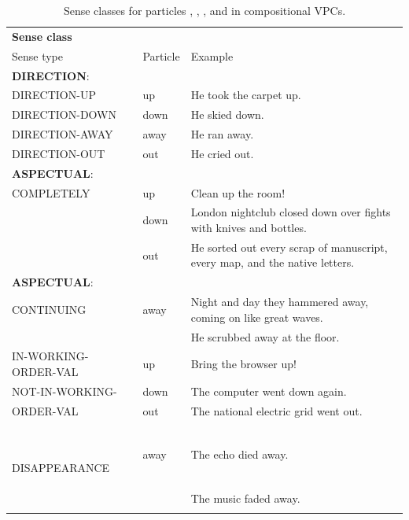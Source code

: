 \documentclass[output=paper,modfonts,nonflat]{langsci/langscibook}
\begin{document}
 
\begin{table}%
\caption{Sense classes for particles , , , and  in compositional VPCs.}
\label{tab:1:senseclasses-prtcls}
\footnotesize
\begin{tabularx}{\textwidth}{llQ}
  \lsptoprule
  \textbf{Sense class}\\
  Sense type & Particle & Example \\\midrule

    \textbf{DIRECTION}: & & \\
    \midrule
    DIRECTION-UP & up & He took the carpet up. \\
    DIRECTION-DOWN & down & He skied down. \\
    DIRECTION-AWAY & away & He ran away. \\
    DIRECTION-OUT & out & He cried out.\\

    \textbf{ASPECTUAL}: & & \\
    \midrule
    COMPLETELY & up & Clean up the room! \\
                        & down & London nightclub closed down over fights with knives and bottles. \\
                        & out & He sorted out every scrap of manuscript, every map, and the native letters.  \\
   
    \textbf{ASPECTUAL}: & & \\
    \midrule
    CONTINUING & away & Night and day they hammered away, coming on like great waves. \\
                         &      & He scrubbed away at the floor.\\

    IN-WORKING-ORDER-VAL & up & Bring the browser up!  \\

    NOT-IN-WORKING-  & down & The computer went down again. \\
    ORDER-VAL       & out & The national electric grid went out. \\\

    DISAPPEARANCE & away & The echo died away. \\
                           &      & The music faded away. \\
\lspbottomrule
 \end{tabularx}

\end{table} 
\end{document}
